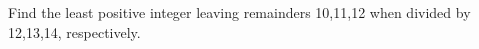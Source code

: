 Find the least positive integer leaving remainders 10,11,12 when divided by 12,13,14, respectively.
